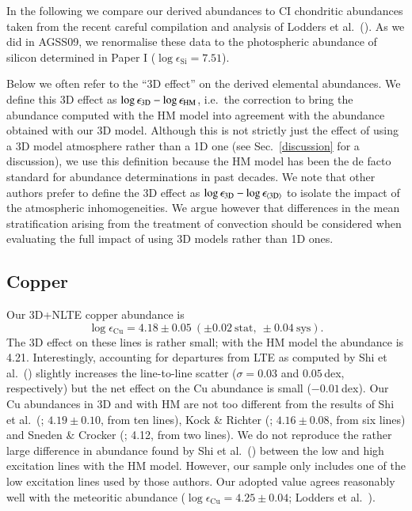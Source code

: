 \documentclass[traditabstract]{aa}
\newcommand{\oneDAVmath}{\langle\mathrm{3D}\rangle}
\begin{document}
In the following we compare our derived abundances to CI chondritic abundances taken from the recent careful compilation and analysis of Lodders et al.\ (\cite{lodd}).  As we did in AGSS09, we renormalise these data to the photospheric abundance of silicon determined in Paper I ($\log\epsilon_\mathrm{Si}=7.51$).

Below we often refer to the ``3D effect'' on the derived elemental abundances. We define this 3D effect as $\log\epsilon_{\rm 3D}-\log\epsilon_{\rm HM}$, i.e.\ the correction to bring the abundance computed with the HM model into agreement with the abundance obtained with our 3D model.  Although this is not strictly just the effect of using a 3D model atmosphere rather than a 1D one (see Sec.\ \ref{discussion} for a discussion), we use this definition because the HM model has been the de facto standard for abundance determinations in past decades. We note that other authors prefer to define the 3D effect as $\log\epsilon_{\rm 3D}-\log\epsilon_{\oneDAVmath}$ to isolate the impact of the atmospheric inhomogeneities. We argue however that differences in the mean stratification arising from the treatment of convection should be considered when evaluating the full impact of using 3D models rather than 1D ones.

\subsection{Copper}
Our 3D+NLTE copper abundance is 
\begin{displaymath}
\log\epsilon_{\mathrm{Cu}}= 4.18\pm 0.05\ (\pm0.02\ \mathrm{stat},\ \pm0.04\ \mathrm{sys}).
\end{displaymath}
The 3D effect on these lines is rather small; with the HM model the abundance is 4.21. Interestingly, accounting for departures from LTE as computed by Shi et al.\ (\cite{Shi14}) slightly increases the line-to-line scatter  ($\sigma = 0.03$ and $0.05$\,dex, respectively) but the net effect on the Cu abundance is small ($-0.01$\,dex). Our Cu abundances in 3D and with HM are not too different from the results of Shi et al.\ (\cite{Shi14}; $4.19 \pm 0.10$, from ten lines), Kock \& Richter (\cite{kock}; $4.16 \pm 0.08$, from six lines) and Sneden \& Crocker (\cite{sned2}; 4.12, from two lines).  We do not reproduce the rather large difference in abundance found by Shi et al.\ (\cite{Shi14}) between the low and high excitation lines with the HM model. However, our sample only includes one of the low excitation lines used by those authors.  Our adopted value agrees reasonably well with the meteoritic abundance ($\log\epsilon_{\mathrm{Cu}}=4.25\pm0.04$; Lodders et al.\ \cite{lodd}).
\end{document}
